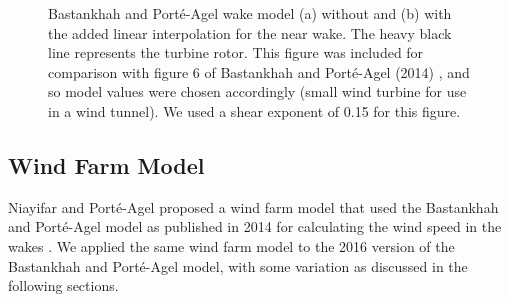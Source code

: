 \documentclass[conf]{new-aiaa}
\begin{document}
\begin{figure}[htbp!]
	\centering
	\caption{Bastankhah and Port\'{e}-Agel wake model (a) without and (b) with the added linear interpolation for the near wake. The heavy black line represents the turbine rotor. This figure was included for comparison with figure 6 of Bastankhah and Port\'{e}-Agel (2014) \cite{bastankhah2014}, and so model values were chosen accordingly (small wind turbine for use in a wind tunnel). We used a shear exponent of 0.15 for this figure.}
	
	\label{fig:model_contours}
\end{figure}

\subsection{Wind Farm Model}\label{sec:npa}
Niayifar and Port\'{e}-Agel proposed a wind farm model that used the Bastankhah and Port\'{e}-Agel model as published in 2014 \cite{bastankhah2014} for calculating the wind speed in the wakes \cite{niayifar2015, niayifar2016}. We applied the same wind farm model to the 2016 version of the Bastankhah and Port\'{e}-Agel model, with some variation as discussed in the following sections.
\end{document}
